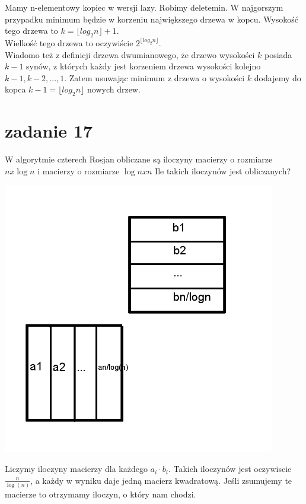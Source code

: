 \documentclass[svgnames]{report}
\begin{document}
Mamy n-elementowy kopiec w wersji lazy. Robimy deletemin. W najgorszym przypadku minimum będzie w korzeniu największego drzewa w kopcu.
 Wysokość tego drzewa to $ k = {\lfloor log_2{n}\rfloor} + 1$.\\
 Wielkość tego drzewa to oczywiście $2^{\lfloor log_2{n}\rfloor}$.\\
 Wiadomo też z definicji drzewa dwumianowego, że drzewo wysokości $k$ posiada $k-1$ synów, z których każdy jest korzeniem drzewa wysokości kolejno $k-1,k-2,..., 1$.
 Zatem usuwając minimum z drzewa o wysokości $k$ dodajemy do kopca $k-1 = \lfloor log_2{n}\rfloor$ nowych drzew.
 
\section{zadanie 17}
\begin{framed}
W algorytmie czterech Rosjan obliczane są iloczyny macierzy o rozmiarze $ n x \log n$ i macierzy o rozmiarze $ \log n x n$ Ile takich iloczynów jest obliczanych?
\end{framed}

\includegraphics[scale=0.55]{images/17.png}

Liczymy iloczyny macierzy dla każdego $a_i \cdot b_i$. Takich iloczynów jest oczywiscie $\frac{n}{\log(n)}$, 
a każdy w wyniku daje jedną macierz kwadratową. Jeśli zsumujemy te macierze to otrzymamy iloczyn, o który nam chodzi.
\end{document}
